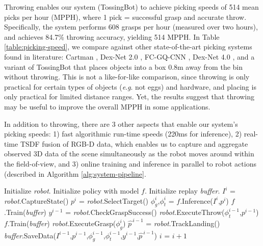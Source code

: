 \documentclass[journal]{IEEEtran}
\newcommand{\eg}{\textit{e}.\textit{g}. }
\newcommand{\rev}{\textcolor{blue}}
\begin{document}
Throwing enables our system (TossingBot) to achieve picking speeds of 514 mean picks per hour (MPPH), where 1 pick = successful grasp and accurate throw. Specifically, the system performs 608 grasps per hour (measured over two hours), and achieves 84.7\% throwing accuracy, yielding 514 MPPH. In Table \ref{table:picking-speed}, we compare against other state-of-the-art picking systems found in literature: Cartman \cite{morrison2018cartman}, Dex-Net 2.0 \cite{mahler2017dex}, FC-GQ-CNN \cite{satish2018on}, Dex-Net 4.0 \cite{mahler2019learning}, and a variant of TossingBot that places objects into a box 0.8m away from the bin without throwing. This is not a like-for-like comparison, since throwing is only practical for certain types of objects (\eg not eggs) and hardware, and placing is only practical for limited distance ranges. Yet, the results suggest that throwing may be useful to improve the overall MPPH in some applications. %

In addition to throwing, there are 3 other aspects that enable our system's picking speeds: 1) fast algorithmic run-time speeds (220ms for inference), 2) real-time TSDF fusion \cite{curless1996volumetric,newcombe2011kinectfusion,zeng20163dmatch,sajjan2020cleargrasp} of RGB-D data, which enables us to capture and aggregate observed 3D data of the scene simultaneously as the robot moves around within the field-of-view, and 3) online training and inference in parallel to robot actions (described in Algorithm \ref{alg:system-pipeline}.

\begin{algorithm}
\caption{System Pipeline}\label{alg:system-pipeline}
\begin{algorithmic}[1]
  \State Initialize \textit{robot}.
  \State Initialize policy with model $f$.
  \State Initialize replay \textit{buffer}.
    \State $I^i$ = \textit{robot}.CaptureState()
    \State $p^i$ = \textit{robot}.SelectTarget()
    \State $\phi^i_g$,$\phi^i_t$ = $f$.Inference($I^i$,$p^i$)
      \State $f$.Train(\textit{buffer})
    \EndWhile
    \State $y^{i-1}$ = \textit{robot}.CheckGraspSuccess()
    \State \textit{robot}.ExecuteThrow($\phi^{i-1}_t$,$p^{i-1}$) 
      \State $f$.Train(\textit{buffer})
    \EndWhile
    \State \textit{robot}.ExecuteGrasp($\phi^{i}_g$) 
    \State $\hat{p\,}^{i-1}$ = \textit{robot}.TrackLanding()
    \State \textit{buffer}.SaveData($I^{i-1}$,$p^{i-1}$,$\phi^{i-1}_g$,$\phi^{i-1}_t$,$y^{i-1}$,$\hat{p\,}^{i-1}$)
    \State $i$ = $i+1$
  \EndWhile
\end{algorithmic}
\end{algorithm}
\end{document}
